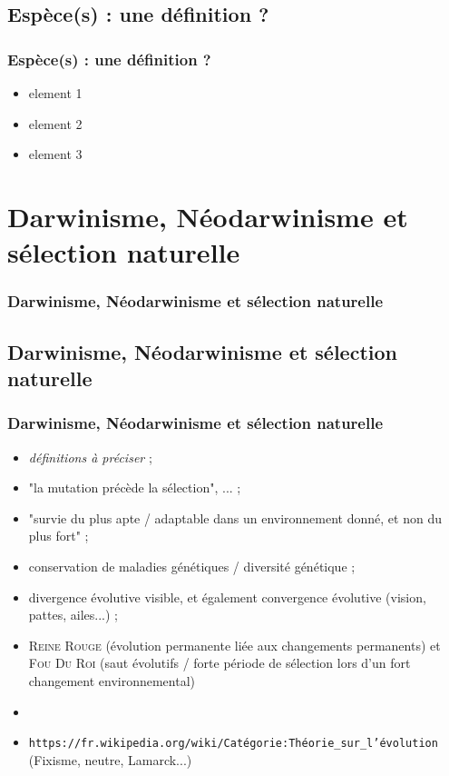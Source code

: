 \documentclass{beamer}
\begin{document}
\subsection{ Esp{\`e}ce(s) : une d{\'e}finition ? }
\begin{frame}
	\frametitle{ Esp{\`e}ce(s) : une d{\'e}finition ? }
	\begin{itemize}
		\item element 1
		\item element 2
		\item element 3
	\end{itemize}
\end{frame}


\section{Darwinisme, N{\'e}odarwinisme et s{\'e}lection naturelle }
\begin{frame}
	\frametitle{Darwinisme, N{\'e}odarwinisme et s{\'e}lection naturelle }
	\tableofcontents[sections=5,currentsection,subsectionstyle=show/shaded/hide]
\end{frame} 

\subsection{ Darwinisme, N{\'e}odarwinisme et s{\'e}lection naturelle }
\begin{frame}
	\frametitle{ Darwinisme, N{\'e}odarwinisme et s{\'e}lection naturelle }
	\begin{itemize}
		\item \emph{d{\'e}finitions {\`a} pr{\'e}ciser} ; 
		\item "la mutation pr{\'e}c{\`e}de la s{\'e}lection", ... ; 
		\item "survie du plus apte / adaptable dans un environnement donn{\'e}, et non du plus fort" ; 
		\item conservation de maladies g{\'e}n{\'e}tiques / diversit{\'e} g{\'e}n{\'e}tique ; 
		\item divergence {\'e}volutive visible, et {\'e}galement convergence {\'e}volutive (vision, pattes, ailes...) ; 
		\item \textsc{Reine Rouge} ({\'e}volution permanente li{\'e}e aux changements permanents) et \textsc{Fou Du Roi} (saut {\'e}volutifs / forte p{\'e}riode de s{\'e}lection lors d'un fort changement environnemental)
		\item[] 
		\item \texttt{https://fr.wikipedia.org/wiki/Cat{\'e}gorie:Th{\'e}orie\_sur\_l'{\'e}volution} (Fixisme, neutre, Lamarck...)
	\end{itemize}
\end{frame}
\end{document}

